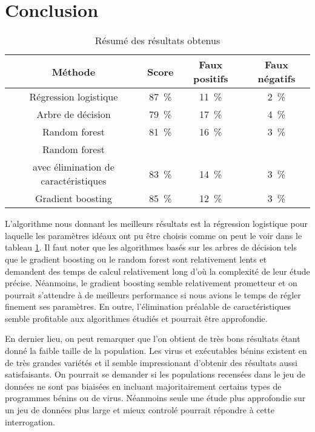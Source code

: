 \documentclass[11pt,a4paper]{article}
\begin{document}
\section{Conclusion}
	\begin{table}
	\begin{center}
	\begin{tabular}{cccc}
		\toprule
		Méthode  &	Score  &	Faux positifs  &	Faux négatifs \\
		\midrule
		Régression logistique 	& \SI{87}{\percent} 	 &	\SI{11}{\percent}  	& \SI{2}{\percent} \\
		Arbre de décision & \SI{79}{\percent} & \SI{17}{\percent} & \SI{4}{\percent} \\
		Random forest & \SI{81}{\percent} & \SI{16}{\percent} & \SI{3}{\percent} \\
		Random forest \\ avec élimination de caractéristiques& \SI{83}{\percent} & \SI{14}{\percent} & \SI{3}{\percent} \\
		Gradient boosting & \SI{85}{\percent} & \SI{12}{\percent} & \SI{3}{\percent} \\
		\bottomrule
	\end{tabular}
	\caption{Résumé des résultats obtenus \label{table:results}}
	\end{center}
\end{table}

	L'algorithme nous donnant les meilleurs résultats est la régression logistique pour laquelle les paramètres idéaux ont pu être choisis comme on peut le voir dans le tableau \ref{table:results}.
	Il faut noter que les algorithmes basés sur les arbres de décision tels que le gradient boosting ou le random forest sont relativement lents et demandent des temps de calcul relativement long d'où la complexité de leur étude précise. Néanmoins, le gradient boosting semble relativement prometteur et on pourrait s'attendre à de meilleurs performance si nous avions le temps de régler finement ses paramètres. En outre, l'élimination préalable de caractéristiques semble profitable aux algorithmes étudiés et pourrait être approfondie.

	En dernier lieu, on peut remarquer que l'on obtient de très bons résultats étant donné la faible taille de la population. Les virus et exécutables bénins existent en de très grandes variétés et il semble impressionant d'obtenir des résultats aussi satisfaisants. On pourrait se demander si les populations recensées dans le jeu de données ne sont pas biaisées en incluant majoritairement certains types de programmes bénins ou de virus. Néanmoins seule une étude plus approfondie sur un jeu de données plus large et mieux controlé pourrait répondre à cette interrogation.




%
\end{document}
